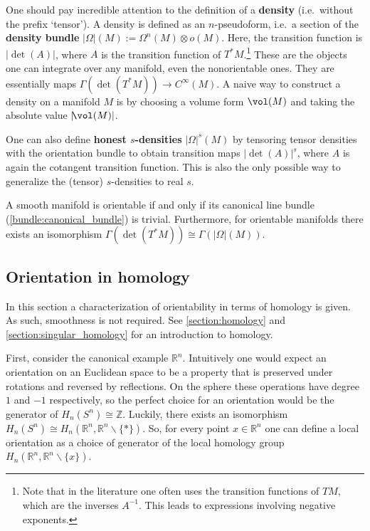     \begin{remark}\label{bundle:honest_density}
        One should pay incredible attention to the definition of a \textbf{density} (i.e.~without the prefix `tensor'). A density is defined as an $n$-pseudoform, i.e.~a section of the \textbf{density bundle} $|\Omega|(M):=\Omega^n(M)\otimes o(M)$. Here, the transition function is $|\!\det(A)|$, where $A$ is the transition function of $T^*M$.\footnote{Note that in the literature one often uses the transition functions of $TM$, which are the inverses $A^{-1}$. This leads to expressions involving negative exponents.} These are the objects one can integrate over any manifold, even the nonorientable ones. They are essentially maps $\Gamma(\det(T^*M))\rightarrow C^\infty(M)$. A naive way to construct a density on a manifold $M$ is by choosing a volume form $\vol(M)$ and taking the absolute value $|\!\vol(M)|$.

        One can also define \textbf{honest $s$-densities} $|\Omega|^s(M)$ by tensoring tensor densities with the orientation bundle to obtain transition maps $|\!\det(A)|^s$, where $A$ is again the cotangent transition function. This is also the only possible way to generalize the (tensor) $s$-densities to real $s$.
    \end{remark}

    \begin{property}[Orientability]
        A smooth manifold is orientable if and only if its canonical line bundle (\cref{bundle:canonical_bundle}) is trivial. Furthermore, for orientable manifolds there exists an isomorphism $\Gamma(\det(T^*M))\cong\Gamma(|\Omega|(M))$.
    \end{property}

\subsection{Orientation in homology}

    In this section a characterization of orientability in terms of homology is given. As such, smoothness is not required. See \cref{section:homology} and \cref{section:singular_homology} for an introduction to homology.

    First, consider the canonical example $\mathbb{R}^n$. Intuitively one would expect an orientation on an Euclidean space to be a property that is preserved under rotations and reversed by reflections. On the sphere these operations have degree $1$ and $-1$ respectively, so the perfect choice for an orientation would be the generator of $H_n(S^n)\cong\mathbb{Z}$. Luckily, there exists an isomorphism $H_n(S^n)\cong H_n(\mathbb{R}^n,\mathbb{R}^n\backslash\{\ast\})$. So, for every point $x\in\mathbb{R}^n$ one can define a local orientation as a choice of generator of the local homology group $H_n(\mathbb{R}^n,\mathbb{R}^n\backslash\{x\})$.

